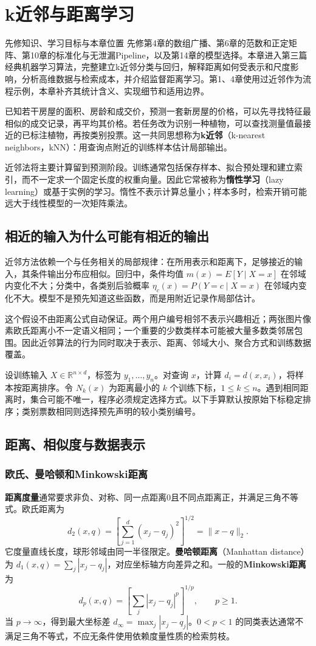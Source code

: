 \documentclass[UTF8,fontset=none,zihao=-4,a4paper]{ctexart}
\newcommand{\chapterpage}[1]{\clearpage\section{#1}}
\newcommand{\term}[1]{\textbf{#1}}
\numberwithin{equation}{section}
\numberwithin{figure}{section}
\begin{document}
\chapterpage{k近邻与距离学习}\label{ch:neighbors}
\begin{infobox}{先修知识、学习目标与本章位置}
先修第4章的数组广播、第6章的范数和正定矩阵、第10章的标准化与无泄漏Pipeline，以及第14章的模型选择。本章进入第三篇经典机器学习算法，完整建立k近邻分类与回归，解释距离如何受表示和尺度影响，分析高维数据与检索成本，并介绍监督距离学习。第1、4章使用过近邻作为流程示例，本章补齐其统计含义、实现细节和适用边界。
\end{infobox}
已知若干房屋的面积、房龄和成交价，预测一套新房屋的价格，可以先寻找特征最相似的成交记录，再平均其价格。若任务改为识别一种植物，可以查找测量值最接近的已标注植物，再按类别投票。这一共同思想称为\term{k近邻}（k-nearest neighbors，kNN）：用查询点附近的训练样本估计局部输出。

近邻法将主要计算留到预测阶段。训练通常包括保存样本、拟合预处理和建立索引，而不一定求一个固定长度的权重向量。因此它常被称为\term{惰性学习}（lazy learning）或基于实例的学习。惰性不表示计算总量小；样本多时，检索开销可能远大于线性模型的一次矩阵乘法。

\subsection{相近的输入为什么可能有相近的输出}
近邻方法依赖一个与任务相关的局部规律：在所用表示和距离下，足够接近的输入，其条件输出分布应相似。回归中，条件均值 $m(x)=E[Y\mid X=x]$ 在邻域内变化不大；分类中，各类别后验概率 $\eta_c(x)=P(Y=c\mid X=x)$ 在邻域内变化不大。模型不是预先知道这些函数，而是用附近记录作局部估计。

这个假设不由距离公式自动保证。两个用户编号相邻不表示兴趣相近；两张图片像素欧氏距离小不一定语义相同；一个重要的少数类样本可能被大量多数类邻居包围。因此近邻算法的行为同时取决于表示、距离、邻域大小、聚合方式和训练数据覆盖。

设训练输入 $X\in\mathbb R^{n\times d}$，标签为 $y_1,\ldots,y_n$。对查询 $x$，计算 $d_i=d(x,x_i)$，将样本按距离排序。令 $N_k(x)$ 为距离最小的 $k$ 个训练下标，$1\le k\le n$。遇到相同距离时，集合可能不唯一，程序必须规定选择方式。以下手算默认按原始下标稳定排序；类别票数相同则选择预先声明的较小类别编号。

\subsection{距离、相似度与数据表示}
\subsubsection{欧氏、曼哈顿和Minkowski距离}
\term{距离度量}通常要求非负、对称、同一点距离0且不同点距离正，并满足三角不等式。欧氏距离为
\[
 d_2(x,q)=\left[\sum_{j=1}^d(x_j-q_j)^2\right]^{1/2}=\|x-q\|_2.
\]
它度量直线长度，球形邻域由同一半径限定。\term{曼哈顿距离}（Manhattan distance）为 $d_1(x,q)=\sum_j|x_j-q_j|$，对应坐标轴方向差异之和。一般的\term{Minkowski距离}为
\[
 d_p(x,q)=\left[\sum_j|x_j-q_j|^p\right]^{1/p},\qquad p\ge1.
\]
当 $p\to\infty$，得到最大坐标差 $d_\infty=\max_j|x_j-q_j|$。$0<p<1$ 的同类表达通常不满足三角不等式，不应无条件使用依赖度量性质的检索剪枝。
\end{document}
